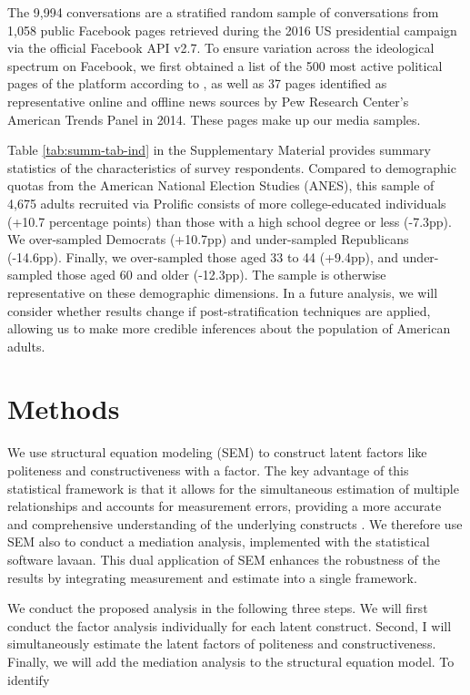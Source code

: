 \documentclass{article}
\begin{document}
The 9,994 conversations are a stratified random sample of conversations from 1,058 public Facebook pages retrieved during the 2016 US presidential campaign via the official Facebook API v2.7. To ensure variation across the ideological spectrum on Facebook, we first obtained a list of the 500 most active political pages of the platform according to \citet{bakshy_exposure_2015}, as well as 37 pages identified as representative online and offline news sources by Pew Research Center’s American Trends Panel in 2014. These pages make up our media samples.

Table \ref{tab:summ-tab-ind} in the Supplementary Material provides summary statistics of the characteristics of survey respondents. Compared to demographic quotas from the American National Election Studies (ANES), this sample of 4,675 adults recruited via Prolific consists of more college-educated individuals (+10.7 percentage points) than those with a high school degree or less (-7.3pp). We over-sampled Democrats (+10.7pp) and under-sampled Republicans (-14.6pp). Finally, we over-sampled those aged 33 to 44 (+9.4pp), and under-sampled those aged 60 and older (-12.3pp). The sample is otherwise representative on these demographic dimensions. In a future analysis, we will consider whether results change if post-stratification techniques are applied, allowing us to make more credible inferences about the population of American adults.

\section{Methods}

We use structural equation modeling (SEM) to construct latent factors like politeness and constructiveness with a factor. The key advantage of this statistical framework is that it allows for the simultaneous estimation of multiple relationships and accounts for measurement errors, providing a more accurate and comprehensive understanding of the underlying constructs \citep{kline_principles_2016}. We therefore use SEM also to conduct a mediation analysis, implemented with the statistical software lavaan. This dual application of SEM enhances the robustness of the results by integrating measurement and estimate into a single framework.

We conduct the proposed analysis in the following three steps. We will first conduct the factor analysis individually for each latent construct. Second, I will simultaneously estimate the latent factors of politeness and constructiveness. Finally, we will add the mediation analysis to the structural equation model. To identify
\end{document}
